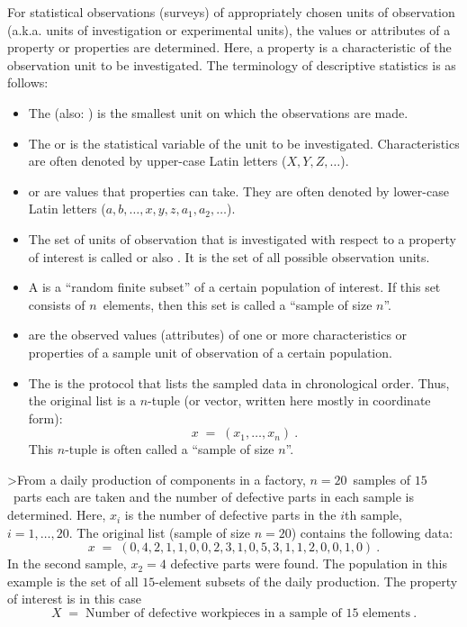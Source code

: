 \begin{MIntro}

For statistical observations (surveys) of appropriately chosen units of observation
(a.k.a. units of investigation or experimental units), the values or attributes of a property or properties are determined. 
Here, a property is a characteristic of the observation unit to be investigated. The terminology of descriptive 
statistics is as follows:

\begin{itemize}
\item{The  (also: ) 
is the smallest unit on which the observations are made.}
\item{The  or  
is the statistical variable of the unit to be investigated. Characteristics are often denoted by upper-case Latin letters 
($X, Y, Z, \ldots$).}
\item{ or  are values
that properties can take. They are often denoted by lower-case Latin letters 
($a, b,\ldots, x, y, z, a_1, a_2,\ldots$).}
\item{The set of units of observation that is investigated with respect to a property of interest 
is called  or also . It is the set of all possible 
observation units.}
\item{A  is a ``random finite subset'' of a certain population of interest. If this 
set consists of $n$~elements, then this set is called a ``sample of size $n$''.}
\item{ are the observed values (attributes) of one or more characteristics or properties 
of a sample unit of observation of a certain population.}
\item{The  is the protocol that lists the sampled data in 
chronological order. Thus, the original list is a $n$-tuple (or vector, written here mostly in coordinate form):
$$
x \;=\; (x_1,\ldots,x_n)\: .
$$
This $n$-tuple is often called a ``sample of size $n$''.}
\end{itemize}

\begin{MExample}
>From a daily production of components in a factory, $n=20$~samples of $15$~parts each are taken and the number of defective parts in each sample 
is determined. Here, $x_i$ is the number of defective parts in the $i$th sample, $i=1,\ldots,20$. The original list (sample of 
size $n=20$) contains the following data:
$$
x\; =\; (0,4,2,1,1,0,0,2,3,1,0,5,3,1,1,2,0,0,1,0)\: .
$$
In the second sample, $x_2=4$ defective parts were found. The population in this example is the set of all 
$15$-element subsets of the daily production. The property of interest is in this case
$$
X\;=\; \text{Number of defective workpieces in a sample of $15$~elements}\: .
$$
\end{MExample}


\end{MIntro}
